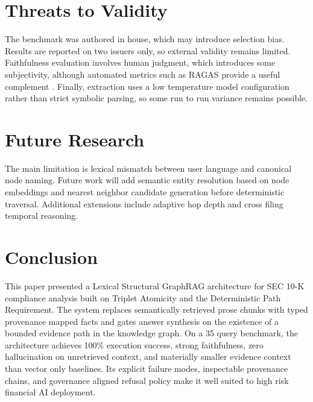 \documentclass[conference]{IEEEtran}
\begin{document}
\section{Threats to Validity}
The benchmark was authored in house, which may introduce selection bias. Results are reported on two issuers only, so external validity remains limited. Faithfulness evaluation involves human judgment, which introduces some subjectivity, although automated metrics such as RAGAS provide a useful complement \cite{ragas2023}. Finally, extraction uses a low temperature model configuration rather than strict symbolic parsing, so some run to run variance remains possible.

\section{Future Research}
The main limitation is lexical mismatch between user language and canonical node naming. Future work will add semantic entity resolution based on node embeddings and nearest neighbor candidate generation before deterministic traversal. Additional extensions include adaptive hop depth and cross filing temporal reasoning.

\section{Conclusion}
This paper presented a Lexical Structural GraphRAG architecture for SEC 10-K compliance analysis built on Triplet Atomicity and the Deterministic Path Requirement. The system replaces semantically retrieved prose chunks with typed provenance mapped facts and gates answer synthesis on the existence of a bounded evidence path in the knowledge graph. On a 35 query benchmark, the architecture achieves 100\% execution success, strong faithfulness, zero hallucination on unretrieved context, and materially smaller evidence context than vector only baselines. Its explicit failure modes, inspectable provenance chains, and governance aligned refusal policy make it well suited to high risk financial AI deployment.
\end{document}
